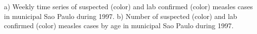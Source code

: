 a) Weekly time series of suspected (color) and lab
confirmed (color) measles cases in municipal Sao Paulo during 1997. b)
Number of suspected (color) and lab confirmed (color) measles cases by
age in municipal Sao Paulo during 1997.